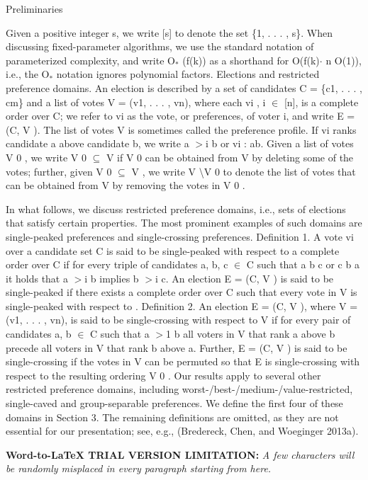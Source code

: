 \documentclass[11pt]{article}
\begin{document}
{\raggedright
Preliminaries
}

{\raggedright
Given a positive integer s, we write [s] to denote the set \{1, . . . , s\}.
When discussing fixed-parameter algorithms, we use the standard notation of
parameterized complexity, and write O${_\ast}$ (f(k)) as a shorthand for
O(f(k)$\cdot{}$ n O(1)), i.e., the O${_\ast}$ notation ignores polynomial
factors. Elections and restricted preference domains. An election is described by
a set of candidates C = \{c1, . . . , cm\} and a list of votes V = (v1, . . . ,
vn), where each vi , i $\in{}$ [n], is a complete order over C; we refer to vi as
the vote, or preferences, of voter i, and write E = (C, V ). The list of votes V
is sometimes called the preference profile. If vi ranks candidate a above
candidate b, we write a $>$i b or vi : ab. Given a list of votes V 0 , we write V
0 $\subseteq{}$ V if V 0 can be obtained from V by deleting some of the votes;
further, given V 0 $\subseteq{}$ V , we write V \textbackslash  V 0 to denote the
list of votes that can be obtained from V by removing the votes in V 0 .
}

{\raggedright
In what follows, we discuss restricted preference domains, i.e., sets of
elections that satisfy certain properties. The most prominent examples of such
domains are single-peaked preferences and single-crossing preferences. Definition
1. A vote vi over a candidate set C is said to be single-peaked with respect to a
complete order  over C if for every triple of candidates a, b, c $\in{}$ C such
that a  b  c or c  b  a it holds that a $>$i b implies b $>$i c. An election E =
(C, V ) is said to be single-peaked if there exists a complete order  over C such
that every vote in V is single-peaked with respect to . Definition 2. An election
E = (C, V ), where V = (v1, . . . , vn), is said to be single-crossing with
respect to V if for every pair of candidates a, b $\in{}$ C such that a $>$1 b
all voters in V that rank a above b precede all voters in V that rank b above a.
Further, E = (C, V ) is said to be single-crossing if the votes in V can be
permuted so that E is single-crossing with respect to the resulting ordering V 0
. Our results apply to several other restricted preference domains, including
worst-/best-/medium-/value-restricted, single-caved and group-separable
preferences. We define the first four of these domains in Section 3. The
remaining definitions are omitted, as they are not essential for our
presentation; see, e.g., (Bredereck, Chen, and Woeginger 2013a).
}

\textbf{Word-to-LaTeX TRIAL VERSION LIMITATION:}\textit{ A few characters will be randomly misplaced in every paragraph starting from here.}
\end{document}
